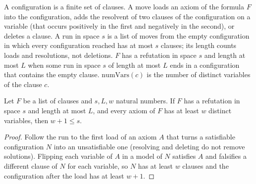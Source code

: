 \begin{definition}
  \label{def:structure-caja-gris}
  \leanok
  A configuration is a finite set of clauses. A move loads an axiom of the formula $F$ into the
  configuration, adds the resolvent of two clauses of the configuration on a variable (that
  occurs positively in the first and negatively in the second), or deletes a clause. A run in space
  $s$ is a list of moves from the empty configuration in which every configuration reached has at
  most $s$ clauses; its length counts loads and resolutions, not deletions. $F$ has a refutation in
  space $s$ and length at most $L$ when some run in space $s$ of length at most $L$ ends in a
  configuration that contains the empty clause. $\mathrm{numVars}(c)$ is the number of distinct
  variables of the clause $c$.
  \own{}
\end{definition}

\begin{theorem}
  \label{thm:structure-espacio-ancho}
  \leanok
  Let $F$ be a list of clauses and $s, L, w$ natural numbers. If $F$ has a refutation in space $s$
  and length at most $L$, and every axiom of $F$ has at least $w$ distinct variables, then $w + 1 \le
  s$.
  \own{}
\end{theorem}

\begin{proof}
  \leanok
  Follow the run to the first load of an axiom $A$ that turns a satisfiable configuration $N$ into an
  unsatisfiable one (resolving and deleting do not remove solutions). Flipping each variable of $A$ in
  a model of $N$ satisfies $A$ and falsifies a different clause of $N$ for each variable, so $N$ has
  at least $w$ clauses and the configuration after the load has at least $w + 1$.
\end{proof}

